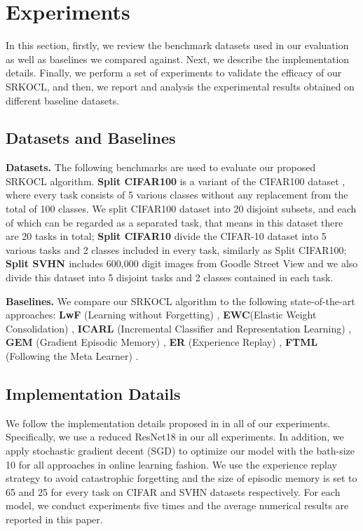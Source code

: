 \documentclass[review]{elsarticle}
\begin{document}
\section{Experiments}

In this section, firstly, we review the benchmark datasets used in our evaluation as well as baselines we compared against. Next, we describe the implementation details. Finally, we perform a set of experiments to validate the efficacy of our SRKOCL, and then, we report and analysis the experimental results obtained on different baseline datasets.

\subsection{Datasets and Baselines}

\textbf{Datasets.} The following benchmarks are used to evaluate our proposed SRKOCL algorithm. \textbf{Split CIFAR100} is a variant of the CIFAR100 dataset \cite{20krizhevsky2009learning}, where every task consists of 5 various classes without any replacement from the total of 100 classes. We split CIFAR100 dataset into 20 disjoint subsets, and each of which can be regarded as a separated task, that means in this dataset there are 20 tasks in total; \textbf{Split CIFAR10} divide the CIFAR-10 dataset \cite{20krizhevsky2009learning} into 5 various tasks and 2 classes included in every task, similarly as Split CIFAR100; \textbf{Split SVHN \cite{21rajasegaran2020itaml}} includes 600,000 digit images from Goodle Street View and we also divide this dataset into 5 disjoint tasks and 2 classes contained in each task.

\textbf{Baselines.} We compare our SRKOCL algorithm to the following state-of-the-art approaches: \textbf{LwF} (Learning without Forgetting) \cite{6leibe2016computer}, \textbf{EWC}(Elastic Weight Consolidation) \cite{4kirkpatrick2017overcoming}, \textbf{ICARL} (Incremental Classifier and Representation Learning) \cite{11rebuffi2017icarl}, \textbf{GEM} (Gradient Episodic Memory) \cite{14lopez2017gradient}, \textbf{ER} (Experience Replay) \cite{22chaudhry2019continual}, \textbf{FTML} (Following the Meta Learner) \cite{23finn2019online}.

\subsection{Implementation Datails}

We follow the implementation details proposed in  \cite{14lopez2017gradient,3pham2019bilevel} in all of our experiments. Specifically, we use a reduced ResNet18 in our all experiments. In addition, we apply stochastic gradient decent (SGD) to optimize our model with the bath-size 10 for all approaches in online learning fashion. We use the experience replay strategy to avoid catastrophic forgetting and the size of episodic memory is set to 65 and 25 for every task on CIFAR and SVHN datasets respectively. For each model, we conduct experiments five times and the average numerical results are reported in this paper.
\end{document}
